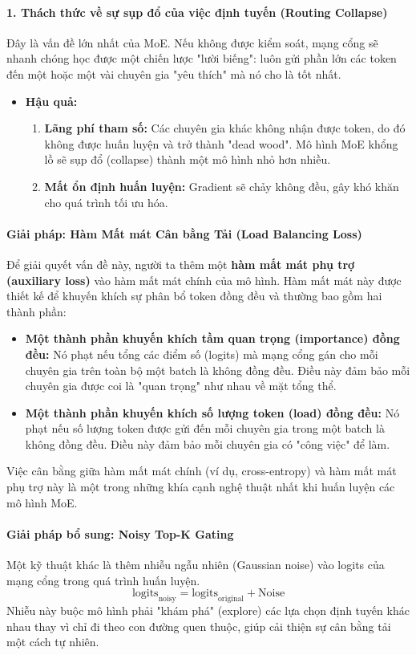 \paragraph{1. Thách thức về sự sụp đổ của việc định tuyến (Routing Collapse)}
Đây là vấn đề lớn nhất của MoE. Nếu không được kiểm soát, mạng cổng sẽ nhanh chóng học được một chiến lược "lười biếng": luôn gửi phần lớn các token đến một hoặc một vài chuyên gia "yêu thích" mà nó cho là tốt nhất.
\begin{itemize}
    \item \textbf{Hậu quả:}
        \begin{enumerate}
            \item \textbf{Lãng phí tham số:} Các chuyên gia khác không nhận được token, do đó không được huấn luyện và trở thành "dead wood". Mô hình MoE khổng lồ sẽ sụp đổ (collapse) thành một mô hình nhỏ hơn nhiều.
            \item \textbf{Mất ổn định huấn luyện:} Gradient sẽ chảy không đều, gây khó khăn cho quá trình tối ưu hóa.
        \end{enumerate}
\end{itemize}

\paragraph{Giải pháp: Hàm Mất mát Cân bằng Tải (Load Balancing Loss)}
Để giải quyết vấn đề này, người ta thêm một \textbf{hàm mất mát phụ trợ (auxiliary loss)} vào hàm mất mát chính của mô hình. Hàm mất mát này được thiết kế để khuyến khích sự phân bổ token đồng đều và thường bao gồm hai thành phần:
\begin{itemize}
    \item \textbf{Một thành phần khuyến khích tầm quan trọng (importance) đồng đều:} Nó phạt nếu tổng các điểm số (logits) mà mạng cổng gán cho mỗi chuyên gia trên toàn bộ một batch là không đồng đều. Điều này đảm bảo mỗi chuyên gia được coi là "quan trọng" như nhau về mặt tổng thể.
    \item \textbf{Một thành phần khuyến khích số lượng token (load) đồng đều:} Nó phạt nếu số lượng token được gửi đến mỗi chuyên gia trong một batch là không đồng đều. Điều này đảm bảo mỗi chuyên gia có "công việc" để làm.
\end{itemize}
Việc cân bằng giữa hàm mất mát chính (ví dụ, cross-entropy) và hàm mất mát phụ trợ này là một trong những khía cạnh nghệ thuật nhất khi huấn luyện các mô hình MoE.

\paragraph{Giải pháp bổ sung: Noisy Top-K Gating}
Một kỹ thuật khác là thêm nhiễu ngẫu nhiên (Gaussian noise) vào logits của mạng cổng trong quá trình huấn luyện.
$$ \text{logits}_{\text{noisy}} = \text{logits}_{\text{original}} + \text{Noise} $$
Nhiễu này buộc mô hình phải "khám phá" (explore) các lựa chọn định tuyến khác nhau thay vì chỉ đi theo con đường quen thuộc, giúp cải thiện sự cân bằng tải một cách tự nhiên.

